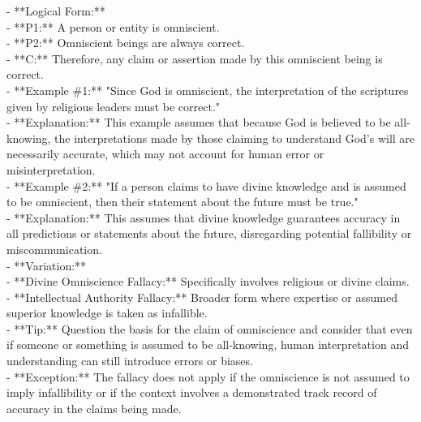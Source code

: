 \documentclass[a4paper,12pt,single,pdftex]{scrbook}
\begin{document}
    
      - **Logical Form:**
    \\

    
        - **P1:** A person or entity is omniscient.
    \\

    
        - **P2:** Omniscient beings are always correct.
    \\

    
        - **C:** Therefore, any claim or assertion made by this omniscient being is correct.
    \\

    
      - **Example \#1:** "Since God is omniscient, the interpretation of the scriptures given by religious leaders must be correct."
    \\

    
      - **Explanation:** This example assumes that because God is believed to be all-knowing, the interpretations made by those claiming to understand God’s will are necessarily accurate, which may not account for human error or misinterpretation.
    \\

    
      - **Example \#2:** "If a person claims to have divine knowledge and is assumed to be omniscient, then their statement about the future must be true."
    \\

    
      - **Explanation:** This assumes that divine knowledge guarantees accuracy in all predictions or statements about the future, disregarding potential fallibility or miscommunication.
    \\

    
      - **Variation:**
    \\

    
        - **Divine Omniscience Fallacy:** Specifically involves religious or divine claims.
    \\

    
        - **Intellectual Authority Fallacy:** Broader form where expertise or assumed superior knowledge is taken as infallible.
    \\

    
      - **Tip:** Question the basis for the claim of omniscience and consider that even if someone or something is assumed to be all-knowing, human interpretation and understanding can still introduce errors or biases.
    \\

    
      - **Exception:** The fallacy does not apply if the omniscience is not assumed to imply infallibility or if the context involves a demonstrated track record of accuracy in the claims being made.
    \\
\end{document}
